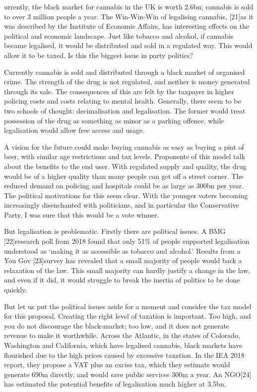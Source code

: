 
   urrently, the black market for cannabis in the UK is worth \textsterling\;2.6bn;
   cannabis is sold to over 3 million people a year. The Win-Win-Win of
   legalising cannabis, [21]as it was described by the Institute of
   Economic Affairs, has interesting effects on the political and economic
   landscape. Just like tobacco and alcohol, if cannabis became legalised,
   it would be distributed and sold in a regulated way. This would allow
   it to be taxed. Is this the biggest issue in party politics?

   Currently cannabis is sold and distributed through a black market of
   organised crime. The strength of the drug is not regulated, and neither
   is money generated through its sale. The consequences of this are felt
   by the taxpayer in higher policing costs and costs relating to mental
   health. Generally, there seem to be two schools of thought:
   decimalisation and legalisation. The former would treat possession of
   the drug as something as minor as a parking offence, while legalisation
   would allow free access and usage.

   A vision for the future could make buying cannabis as easy as buying a
   pint of beer, with similar age restrictions and tax levels. Proponents
   of this model talk about the benefits to the end user. With regulated
   supply and quality, the drug would be of a higher quality than many
   people can get off a street corner. The reduced demand on policing and
   hospitals could be as large as \textsterling\;300bn per year. The political
   motivations for this seem clear. With the younger voters becoming
   increasingly disenchanted with politicians, and in particular the
   Conservative Party, I was sure that this would be a vote winner.

   But legalisation is problematic. Firstly there are political issues. A
   BMG [22]research poll from 2018 found that only 51\% of people supported
   legalisation understood as `making it as accessible as tobacco and
   alcohol.' Results from a You Gov [23]survey has revealed that a small
   majority of people would back a relaxation of the law. This small
   majority can hardly justify a change in the law, and even if it did, it
   would struggle to break the inertia of politics to be done quickly.

   But let us put the political issues aside for a moment and consider the
   tax model for this proposal. Creating the right level of taxation is
   important. Too high, and you do not discourage the black-market; too
   low, and it does not generate revenue to make it worthwhile. Across the
   Atlantic, in the states of Colorado, Washington and California, which
   have legalised cannabis, black markets have flourished due to the high
   prices caused by excessive taxation. In the IEA 2018 report, they
   propose a VAT plus an excise tax, which they estimate would generate
   \textsterling\;690m directly, and would save public services \textsterling\;300m a year. An NGO[24]
   has estimated the potential benefits of legalisation much higher at
   \textsterling\;3.5bn.
   
